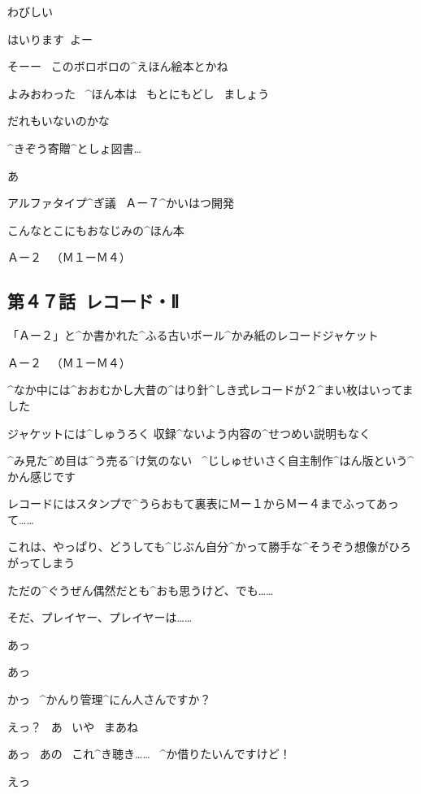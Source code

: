 \page[47]
\Kokone わびしい

\Kokone はいります\ よー

\Kokone そーー
\ このボロボロの^{えほん}{絵本}とかね

\Sign よみおわった
\ ^{ほん}{本}は
\ もとにもどし
\ ましょう

\page[48]
\Kokone だれもいないのかな

\page[49]
\Sign ^{きぞう}{寄贈}^{としょ}{図書}…

\Kokone あ

\Sign アルファタイプ^{ぎ}{議}
\ Ａー７^{かいはつ}{開発}

\Kokone こんなとこにもおなじみの^{ほん}{本}

\page[50]
\Sign Ａー２
\ （Ｍ１ーＭ４）


\subsection{第４７話\ レコード・Ⅱ}

\page[53]
\Kokone 「Ａー２」と^{か}{書}かれた^{ふる}{古}いボール^{かみ}{紙}のレコードジャケット

\Sign Ａー２
\ （Ｍ１ーＭ４）

\Kokone ^{なか}{中}には^{おおむかし}{大昔}の^{はり}{針}^{しき}{式}レコードが２^{まい}{枚}はいってました

\page[54]
\Kokone ジャケットには^{しゅうろく }{収録}^{ないよう}{内容}の^{せつめい}{説明}もなく

\Kokone ^{み}{見}た^{め}{目}は^{う}{売}る^{け}{気}のない
\ ^{じしゅせいさく}{自主制作}^{はん}{版}という^{かん}{感}じです

\Kokone レコードにはスタンプで^{うらおもて}{裏表}にＭー１からＭー４までふってあって……

\Kokone これは、やっぱり、どうしても^{じぶん}{自分}^{かって}{勝手}な^{そうぞう}{想像}がひろがってしまう

\page[55]
\Kokone ただの^{ぐうぜん}{偶然}だとも^{おも}{思}うけど、でも……

\Kokone そだ、プレイヤー、プレイヤーは……

\page[56]
\Kokone あっ

\Person あっ

\Kokone かっ
\ ^{かんり}{管理}^{にん}{人}さんですか？

\Person えっ？
\ あ
\ いや
\ まあね

\Kokone あっ
\ あの
\ これ^{き}{聴}き……
\ ^{か}{借}りたいんですけど！

\Person えっ


